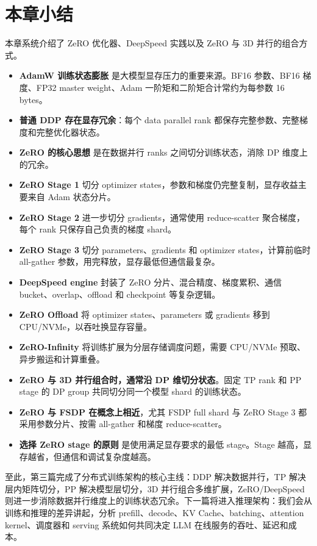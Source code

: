 \section{本章小结}
\label{sec:chapter11-summary}

本章系统介绍了 ZeRO 优化器、DeepSpeed 实践以及 ZeRO 与 3D 并行的组合方式。

\begin{itemize}
\item \textbf{AdamW 训练状态膨胀} 是大模型显存压力的重要来源。BF16 参数、BF16 梯度、FP32 master weight、Adam 一阶矩和二阶矩合计常约为每参数 16 bytes。
\item \textbf{普通 DDP 存在显存冗余}：每个 data parallel rank 都保存完整参数、完整梯度和完整优化器状态。
\item \textbf{ZeRO 的核心思想} 是在数据并行 ranks 之间切分训练状态，消除 DP 维度上的冗余。
\item \textbf{ZeRO Stage 1} 切分 optimizer states，参数和梯度仍完整复制，显存收益主要来自 Adam 状态分片。
\item \textbf{ZeRO Stage 2} 进一步切分 gradients，通常使用 reduce-scatter 聚合梯度，每个 rank 只保存自己负责的梯度 shard。
\item \textbf{ZeRO Stage 3} 切分 parameters、gradients 和 optimizer states，计算前临时 all-gather 参数，用完释放，显存最低但通信最复杂。
\item \textbf{DeepSpeed engine} 封装了 ZeRO 分片、混合精度、梯度累积、通信 bucket、overlap、offload 和 checkpoint 等复杂逻辑。
\item \textbf{ZeRO Offload} 将 optimizer states、parameters 或 gradients 移到 CPU/NVMe，以吞吐换显存容量。
\item \textbf{ZeRO-Infinity} 将训练扩展为分层存储调度问题，需要 CPU/NVMe 预取、异步搬运和计算重叠。
\item \textbf{ZeRO 与 3D 并行组合时，通常沿 DP 维切分状态}。固定 TP rank 和 PP stage 的 DP group 共同切分同一个模型 shard 的训练状态。
\item \textbf{ZeRO 与 FSDP 在概念上相近}，尤其 FSDP full shard 与 ZeRO Stage 3 都采用参数分片、按需 all-gather 和梯度 reduce-scatter。
\item \textbf{选择 ZeRO stage 的原则} 是使用满足显存要求的最低 stage。Stage 越高，显存越省，但通信和调试复杂度越高。
\end{itemize}

至此，第三篇完成了分布式训练架构的核心主线：DDP 解决数据并行，TP 解决层内矩阵切分，PP 解决模型层切分，3D 并行组合多维扩展，ZeRO/DeepSpeed 则进一步消除数据并行维度上的训练状态冗余。下一篇将进入推理架构：我们会从训练和推理的差异讲起，分析 prefill、decode、KV Cache、batching、attention kernel、调度器和 serving 系统如何共同决定 LLM 在线服务的吞吐、延迟和成本。
